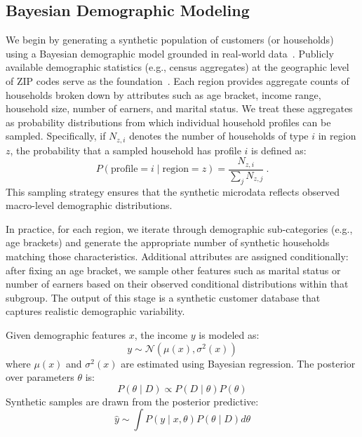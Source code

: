 \documentclass[conference]{IEEEtran}
\begin{document}
\subsection{Bayesian Demographic Modeling} 
We begin by generating a synthetic population of customers (or households) using a Bayesian demographic model grounded in real-world data~\cite{acsdata}. Publicly available demographic statistics (e.g., census aggregates) at the geographic level of ZIP codes serve as the foundation~\cite{acsdata}. Each region provides aggregate counts of households broken down by attributes such as age bracket, income range, household size, number of earners, and marital status. We treat these aggregates as probability distributions from which individual household profiles can be sampled. Specifically, if \( N_{z,i} \) denotes the number of households of type \( i \) in region \( z \), the probability that a sampled household has profile \( i \) is defined as:
\begin{equation}
P(\text{profile}=i \mid \text{region}=z) = \frac{N_{z,i}}{\sum_j N_{z,j}}~.
\label{eq:bayes-demo}
\end{equation}
This sampling strategy ensures that the synthetic microdata reflects observed macro-level demographic distributions.

In practice, for each region, we iterate through demographic sub-categories (e.g., age brackets) and generate the appropriate number of synthetic households matching those characteristics. Additional attributes are assigned conditionally: after fixing an age bracket, we sample other features such as marital status or number of earners based on their observed conditional distributions within that subgroup. The output of this stage is a synthetic customer database that captures realistic demographic variability.



Given demographic features \( x \), the income \( y \) is modeled as:
\[
y \sim \mathcal{N}(\mu(x), \sigma^2(x))
\]
where \( \mu(x) \) and \( \sigma^2(x) \) are estimated using Bayesian regression. The posterior over parameters \( \theta \) is:
\[
P(\theta \mid D) \propto P(D \mid \theta) P(\theta)
\]
Synthetic samples are drawn from the posterior predictive:
\[
\hat{y} \sim \int P(y \mid x, \theta) P(\theta \mid D) d\theta
\]
\end{document}
